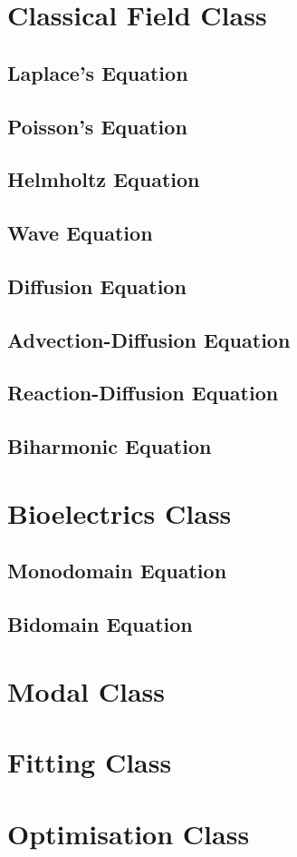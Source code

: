 \section{Classical Field Class}

\subsection{Laplace's Equation}

\subsection{Poisson's Equation}

\subsection{Helmholtz Equation}

\subsection{Wave Equation}

\subsection{Diffusion Equation}

\subsection{Advection-Diffusion Equation}

\subsection{Reaction-Diffusion Equation}

\subsection{Biharmonic Equation}

\section{Bioelectrics Class}

\subsection{Monodomain Equation}

\subsection{Bidomain Equation}
\section{Modal Class}

\section{Fitting Class}

\section{Optimisation Class}
